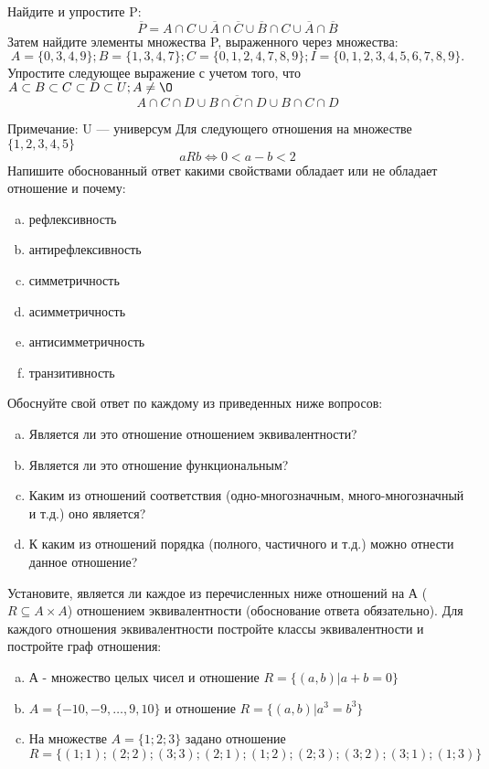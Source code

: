 \documentclass[10pt]{exam}
\begin{document}
\begin{questions}
\question
Найдите и упростите P:
\begin{equation*}
\overline{P} = A \cap C \cup \overline{A} \cap \overline{C} \cup \overline{B} \cap C \cup \overline{A} \cap \overline{B}
\end{equation*}
Затем найдите элементы множества P, выраженного через множества:
\begin{equation*}
A = \{0, 3, 4, 9\}; 
B = \{1, 3, 4, 7\};
C = \{0, 1, 2, 4, 7, 8, 9\};
I = \{0, 1, 2, 3, 4, 5, 6, 7, 8, 9\}.
\end{equation*}\question
Упростите следующее выражение с учетом того, что $A\subset B \subset C \subset D \subset U; A \neq \O$
\begin{equation*}
A \cap C  \cap D \cup B \cap \overline{C} \cap D \cup B \cap C \cap D
\end{equation*}

Примечание: U — универсум\question
Для следующего отношения на множестве $\{1, 2, 3, 4, 5\}$ 
\begin{equation*}
aRb \iff 0 < a-b<2
\end{equation*}
Напишите обоснованный ответ какими свойствами обладает или не обладает отношение и почему:   
\begin{enumerate} [a)]\setcounter{enumi}{0}
\item рефлексивность
\item антирефлексивность
\item симметричность
\item асимметричность
\item антисимметричность
\item транзитивность
\end{enumerate}

Обоснуйте свой ответ по каждому из приведенных ниже вопросов:
\begin{enumerate} [a)]\setcounter{enumi}{0}
    \item Является ли это отношение отношением эквивалентности?
    \item Является ли это отношение функциональным?
    \item Каким из отношений соответствия (одно-многозначным, много-многозначный и т.д.) оно является?
    \item К каким из отношений порядка (полного, частичного и т.д.) можно отнести данное отношение?
\end{enumerate}
\question
Установите, является ли каждое из перечисленных ниже отношений на А ($R \subseteq A \times A$) отношением эквивалентности (обоснование ответа обязательно). Для каждого отношения эквивалентности 
постройте классы эквивалентности и постройте граф отношения:
\begin{enumerate}[a)]\setcounter{enumi}{0}
\item А - множество целых чисел и отношение $R = \{(a,b)|a + b = 0\}$
\item $A = \{-10, -9, …, 9, 10\}$ и отношение $R = \{(a,b)|a^{3} = b^{3}\}$
\item На множестве $A = \{1; 2; 3\}$ задано отношение $R = \{(1; 1); (2; 2); (3; 3); (2; 1); (1; 2); (2; 3); (3; 2); (3; 1); (1; 3)\}$


\end{enumerate}
\end{questions}
\end{document}
